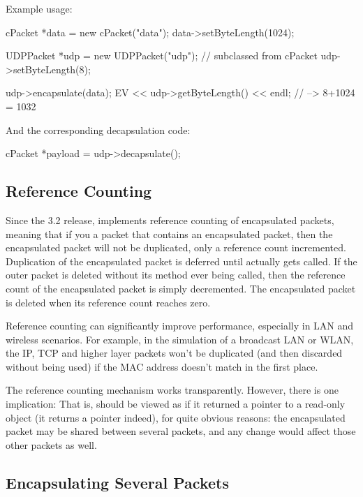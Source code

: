 Example usage:

\begin{cpp}
cPacket *data = new cPacket("data");
data->setByteLength(1024);

UDPPacket *udp = new UDPPacket("udp"); // subclassed from cPacket
udp->setByteLength(8);

udp->encapsulate(data);
EV << udp->getByteLength() << endl; // --> 8+1024 = 1032
\end{cpp}

And the corresponding decapsulation code:

\begin{cpp}
cPacket *payload = udp->decapsulate();
\end{cpp}



\subsection{Reference Counting}
\label{sec:messages:reference-counting}

Since the 3.2 release, {\opp} implements reference counting of
encapsulated packets, meaning that if you  a packet
that contains an encapsulated packet, then the encapsulated packet will
not be duplicated, only a reference count incremented. Duplication of
the encapsulated packet is deferred until 
actually gets called. If the outer packet is deleted without its
 method ever being called, then the reference
count of the encapsulated packet is simply decremented. The
encapsulated packet is deleted when its reference count reaches
zero.

Reference counting can significantly improve performance, especially
in LAN and wireless scenarios. For example, in the simulation of a
broadcast LAN or WLAN, the IP, TCP and higher layer packets won't
be duplicated (and then discarded without being used) if the
MAC address doesn't match in the first place.

The reference counting mechanism works transparently. However, there
is one implication:  That is,
 should be viewed as if it returned a
pointer to a read-only object (it returns a  pointer
indeed), for quite obvious reasons: the encapsulated packet may be
shared between several packets, and any change would affect those
other packets as well.


\subsection{Encapsulating Several Packets}
\label{sec:messages:encapsulating-several-packets}

